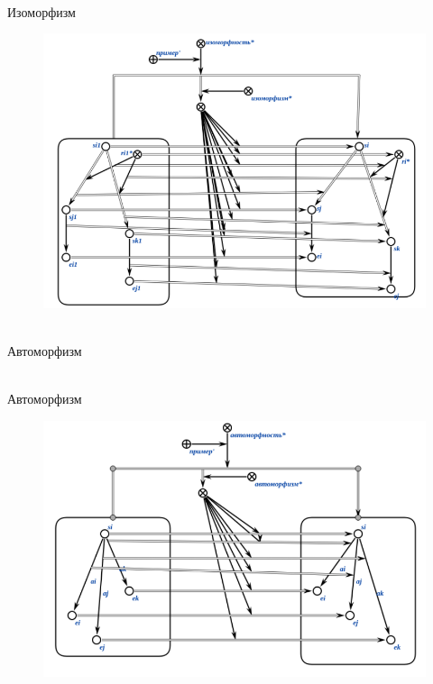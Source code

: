 \documentclass{beamer}
\begin{document}
\begin{frame}{\\Изоморфизм}
    \topline
    \begin{center}
        \begin{figure}[b]
            \centering
            \includegraphics[scale=.5]{figures/sd_correspondences/Isomorphism.png}
        \end{figure}
    \end{center}
\end{frame}

\begin{frame}{\\Автоморфизм}
\topline
\begin{SCn}

\end{SCn}
\end{frame}

\begin{frame}{\\Автоморфизм}
    \topline
    \begin{center}
        \begin{figure}[b]
            \centering
            \includegraphics[scale=.55]{figures/sd_correspondences/Automorphism.png}
        \end{figure}
    \end{center}
\end{frame}
\end{document}
